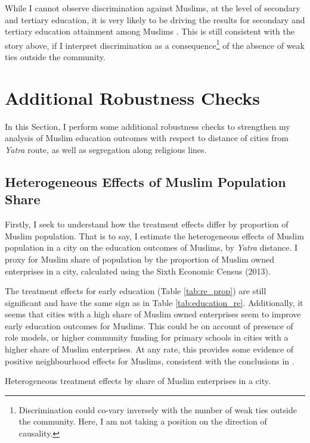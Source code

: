 \documentclass{article}
\begin{document}
While I cannot observe discrimination against Muslims, at the level of secondary and tertiary education, it is very likely to be driving the results for secondary and tertiary education attainment among Muslims \citep{basant2012education}. This is still consistent with the story above, if I interpret discrimination as a consequence\footnote{Discrimination could co-vary inversely with the number of weak ties outside the community. Here, I am not taking a position on the direction of causality.} of the absence of weak ties outside the community.

\section{Additional Robustness Checks}\label{placebo}
In this Section, I perform some additional robustness checks to strengthen my analysis of Muslim education outcomes with respect to distance of cities from \textit{Yatra} route, as well as segregation along religious lines. 

\subsection{Heterogeneous Effects of Muslim Population Share}
Firstly, I seek to understand how the treatment effects differ by proportion of Muslim population. That is to say, I estimate the heterogeneous effects of Muslim population in a city on the education outcomes of Muslims, by \textit{Yatra} distance. I proxy for Muslim share of population by the proportion of Muslim owned enterprises in a city, calculated using the Sixth Economic Census (2013). 

The treatment effects for early education (Table \ref{tab:re_prop}) are still significant and have the same sign as in Table \ref{tab:education_re}. Additionally, it seems that cities with a high share of Muslim owned enterprises seem to improve early education outcomes for Muslims. This could be on account of presence of role models, or higher community funding for primary schools in cities with a higher share of Muslim enterprises. At any rate, this provides some evidence of positive neighbourhood effects for Muslims, consistent with the conclusions in \cite{geruso2018neighborhood}.

\begin{table}[H]
    \centering
    
    \caption{Heterogeneous treatment effects by share of Muslim enterprises in a city.}
    \label{tab:re_prop}
\end{table}
\end{document}
